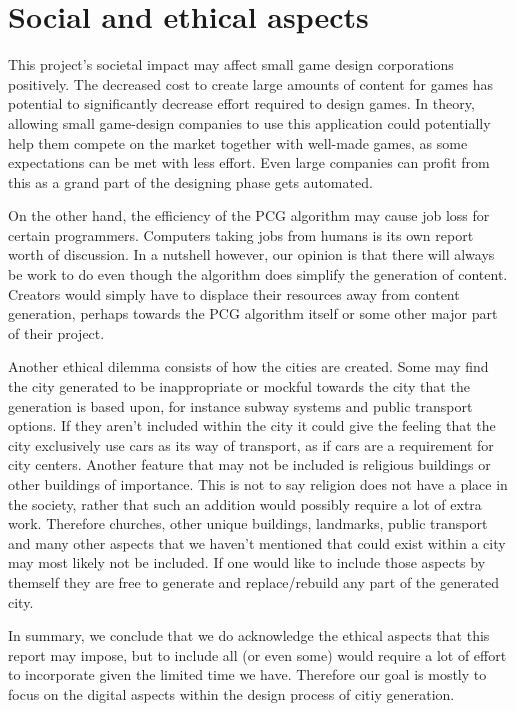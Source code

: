 \section{Social and ethical aspects}
This project's societal impact may affect small game design corporations positively.
The decreased cost to create large amounts of content for games has potential to significantly decrease effort required to design games.
In theory, allowing small game-design companies to use this application could potentially help them compete on the market together with well-made games, as some expectations can be met with less effort.
Even large companies can profit from this as a grand part of the designing phase gets automated.

On the other hand, the efficiency of the PCG algorithm may cause job loss for certain programmers.
Computers taking jobs from humans is its own report worth of discussion.
In a nutshell however, our opinion is that there will always be work to do even though the algorithm does simplify the generation of content.
Creators would simply have to displace their resources away from content generation, perhaps towards the PCG algorithm itself or some other major part of their project.

Another ethical dilemma consists of how the cities are created.
Some may find the city generated to be inappropriate or mockful towards the city that the generation is based upon,
for instance subway systems and public transport options.
If they aren't included within the city it could give the feeling that the city exclusively use cars as its way of transport, as if cars are a requirement for city centers.
Another feature that may not be included is religious buildings or other buildings of importance.
This is not to say religion does not have a place in the society, rather that such an addition would possibly require a lot of extra work.
Therefore churches, other unique buildings, landmarks, public transport and many other aspects that we haven't mentioned that could exist within a city may most likely not be included.
If one would like to include those aspects by themself they are free to generate and replace/rebuild any part of the generated city.

In summary, we conclude that we do acknowledge the ethical aspects that this report may impose, but to include all (or even some) would require a lot of effort to incorporate given the limited time we have.
Therefore our goal is mostly to focus on the digital aspects within the design process of citiy generation. 